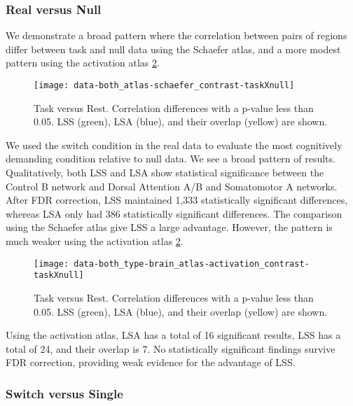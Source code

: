 \documentclass[10pt,letterpaper]{article}
\begin{document}
\subsubsection*{Real versus Null}
\label{results:bsc-taskswitchXNull}

We demonstrate a broad pattern where the correlation between pairs of
regions differ between task and null data using the Schaefer atlas,
and a more modest pattern using the activation atlas \ref{fig:act_taskvnull}.

\begin{figure}[H]
  \centering
  \texttt{[image: data-both\_atlas-schaefer\_contrast-taskXnull]}
  \caption{
    Task versus Rest. Correlation differences with a p-value less than 0.05.
    LSS (green), LSA (blue), and their overlap (yellow) are shown.
  }
  \label{fig:sch_taskvnull}
\end{figure}

We used the switch condition in the real data to evaluate the most cognitively demanding condition
relative to null data.
We see a broad pattern of results.
Qualitatively, both LSS and LSA show statistical significance between the Control B network and
Dorsal Attention A/B and Somatomotor A networks.
After FDR correction, LSS maintained 1,333 statistically significant differences,
whereas LSA only had 386 statistically significant differences.
The comparison using the Schaefer atlas give LSS a large advantage.
However, the pattern is much weaker using the activation atlas \ref{fig:act_taskvnull}.

\begin{figure}[H]
  \centering
  \texttt{[image: data-both\_type-brain\_atlas-activation\_contrast-taskXnull]}
  \caption{
    Task versus Rest. Correlation differences with a p-value less than 0.05.
    LSS (green), LSA (blue), and their overlap (yellow) are shown.
  }
  \label{fig:act_taskvnull}
\end{figure}

Using the activation atlas, LSA has a total of 16 significant results,
LSS has a total of 24, and their overlap is 7.
No statistically significant findings survive FDR correction, providing
weak evidence for the advantage of LSS.
\subsubsection*{Switch versus Single}
\label{results:bsc-switchXsingle}
\end{document}
